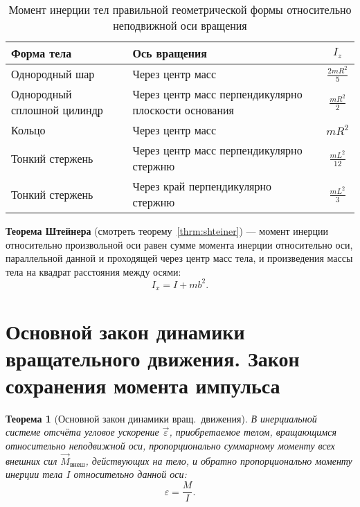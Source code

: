 \documentclass[10pt]{scrbook}
\newtheorem{theorem}{Теорема}[section]
\begin{document}
\begin{table}[htpb]
	\centering
	\caption{Момент инерции тел правильной геометрической формы относительно неподвижной оси вращения}

	\begin{tabular}{p{} p{} c}
		\toprule
		Форма тела                  & Ось вращения                                         & \( I_z \)               \\
		\midrule
		Однородный шар              & Через центр масс                                     & \( \frac{2 m R^2}{5} \) \\
		Однородный сплошной цилиндр & Через центр масс перпендикулярно плоскости основания & \( \frac{m R^2}{2} \)   \\
		Кольцо                      & Через центр масс                                     & \( m R^2 \)             \\
		Тонкий стержень             & Через центр масс перпендикулярно стержню             & \( \frac{m L^2}{12} \)  \\
		Тонкий стержень             & Через край перпендикулярно стержню                   & \( \frac{m L^2}{3} \)   \\
		\bottomrule
	\end{tabular}
\end{table}

\textbf{Теорема Штейнера} (смотреть теорему~\ref{thrm:shteiner}) — момент
инерции относительно произвольной оси равен сумме момента инерции относительно
оси, параллельной данной и проходящей через центр масс тела, и произведения
массы тела на квадрат расстояния между осями: \[
	I_x = I + mb^2
	.\]

\section[восьмой вопрос]{Основной закон динамики вращательного движения. Закон
  сохранения момента импульса}

\begin{theorem}[Основной закон динамики вращ.~движения]
	В инерциальной системе отсчёта угловое ускорение $\vec{\varepsilon}$,
	приобретаемое телом, вращающимся относительно неподвижной оси,
	пропорционально суммарному моменту всех внешних сил $\vec{M}_\text{внеш}$,
	действующих на тело, и обратно пропорционально моменту инерции тела $I$
	относительно данной оси: \[
		\varepsilon = \frac{M}{I}
		.\]
\end{theorem}
\end{document}
